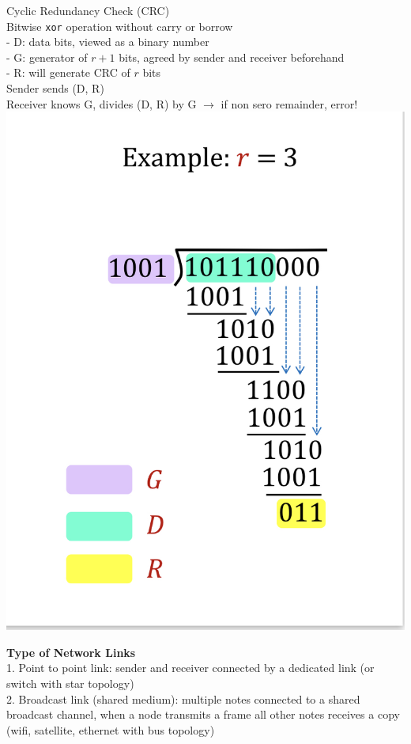 \documentclass[10pt, a4paper]{article}
\newcommand{\red}[1]{{\color{red}#1}}
\begin{document}
\begin{multicols*}{3}
		Cyclic Redundancy Check (CRC)\\
		Bitwise \texttt{xor} operation without carry or borrow\\
		- \red{D}: data bits, viewed as a binary number\\
		- \red{G}: generator of $r + 1$ bits, agreed by sender and receiver beforehand\\
		- \red{R}: will generate CRC of $r$ bits\\
		Sender sends (D, R)\\
		Receiver knows G, divides (D, R) by G $\rightarrow$ if non sero remainder, \red{error!}\\
		\includegraphics[scale=.13]{./assets/crc}

		\textbf{Type of Network Links}\\
		1. Point to point link: sender and receiver connected by a dedicated link (or switch with star topology)\\
		2. Broadcast link (shared medium): multiple notes connected to a shared broadcast channel, when a node transmits a frame all other notes receives a copy (wifi, satellite, ethernet with bus topology)\\


\end{multicols*}
\end{document}
